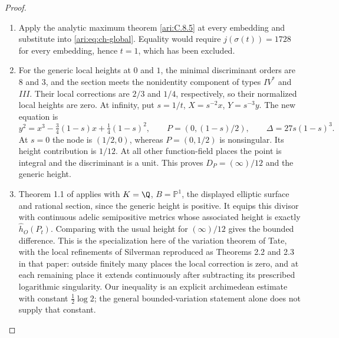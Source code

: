\begin{proof}
\begin{enumerate}[label=\arabic*.,leftmargin=*]
\item Apply the analytic maximum theorem \ref{ari:C.8.5} at every embedding
and substitute into \eqref{ari:eq:ch-global}. Equality would
require $j(\sigma(t))=1728$ for every embedding, hence $t=1$,
which has been excluded.

\item For the generic local heights at $0$ and $1$, the minimal
discriminant orders are $8$ and $3$, and the section meets
the nonidentity component of types $IV^*$ and $III$.
Their local corrections are $2/3$ and $1/4$, respectively,
so their normalized local heights are zero. At infinity,
put $s=1/t$, $X=s^{-2}x$, $Y=s^{-3}y$. The new equation is
\[
 y^2=x^3-\tfrac34(1-s)x+\tfrac14(1-s)^2,
 \qquad P=(0,(1-s)/2),\qquad\Delta=27s(1-s)^3.
\]
At $s=0$ the node is $(1/2,0)$, whereas $P=(0,1/2)$ is
nonsingular. Its height contribution is $1/12$.
At all other function-field places the point is integral
and the discriminant is a unit. This proves
$D_P=(\infty)/12$ and the generic height.

\item Theorem 1.1 of \citet{demarco2017} applies with $K=\Q$,
$B=\mathbb P^1$, the displayed elliptic surface and rational
section, since the generic height is positive. It equips
this divisor with continuous adelic semipositive metrics
whose associated height is exactly $\widehat h_O(P_t)$.
Comparing with the usual height for $(\infty)/12$ gives the
bounded difference. This is the specialization here of the
variation theorem of Tate, with the local refinements of
Silverman reproduced as Theorems 2.2 and 2.3 in that paper:
outside finitely many places the local correction is zero,
and at each remaining place it extends continuously after
subtracting its prescribed logarithmic singularity.
Our inequality is an explicit archimedean estimate with
constant $\frac12\log2$; the general bounded-variation
statement alone does not supply that constant.


\end{enumerate}
\end{proof}
